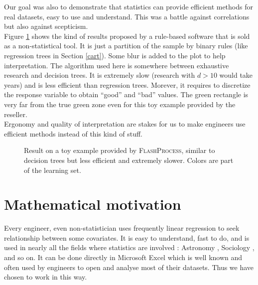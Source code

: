 \documentclass[12pt,a4paper]{report}
\begin{document}
			Our goal was also to demonstrate that statistics can provide efficient methods for real datasets, easy to use and understand.	This was a battle against correlations but also against scepticism. \\
			
			Figure \ref{Regle2D} shows the kind of results proposed by a rule-based software that is sold as a non-statistical tool. It is just a partition of the sample by binary rules (like regression trees in Section \ref{cart}). Some blur is added to the plot to help interpretation. The algorithm used here is somewhere between exhaustive research and decision trees. It is extremely slow (research with $d>10$ would take years) and is less efficient than regression trees. Morever, it requires to discretize the response variable to obtain ``good'' and ``bad'' values. The green rectangle is very far from the true green zone even for this toy example provided by the reseller.\\
			
			Ergonomy and quality of interpretation are stakes for us to make engineers use efficient methods instead of this kind of stuff.
	
		\begin{figure}[h!]
	\caption{Result on a toy example provided by \textsc{FlashProcess}, similar to decision trees but less efficient and extremely slower. Colors are part of the learning set.}\label{Regle2D}
\end{figure}	



	\section{Mathematical motivation}
	
		Every engineer, even non-statistician uses frequently linear regression to seek relationship between some covariates. It is easy to understand, fast to do, and is used in nearly all the fields where statistics are involved \cite{montgomery2012introduction}: Astronomy \cite{isobe1990linear}, Sociology \cite{longford2012revision}, and so on. It can be done directly in Microsoft Excel which is well known and often used by engineers to open and analyse most of their datasets. Thus we have chosen to work in this way.\\
		 
\end{document}
